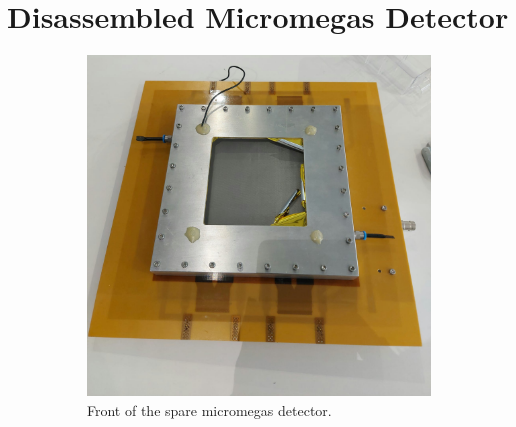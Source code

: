 \documentclass[sn-mathphys-num,iicol]{sn-jnl}
\theoremstyle{thmstyleone}
\theoremstyle{thmstyletwo}
\theoremstyle{thmstylethree}
\begin{document}

\clearpage\appendix\onecolumn


\section{Disassembled Micromegas Detector}
\renewcommand{\thefigure}{\Alph{section}\arabic{figure}}
\setcounter{figure}{0}
\renewcommand{\thetable}{\Alph{section}\arabic{table}}
\setcounter{table}{0}


\begin{figure}[h]
  \centering
    \begin{subfigure}{0.47\textwidth}
        \includegraphics[width=\linewidth]{figures/micromegas_closed.jpeg}
        \caption{Front of the spare micromegas detector.}
        \label{fig:micromegas_closed}
    \end{subfigure}
    \begin{subfigure}{0.51\textwidth}

\end{subfigure}
\end{figure}
\end{document}
